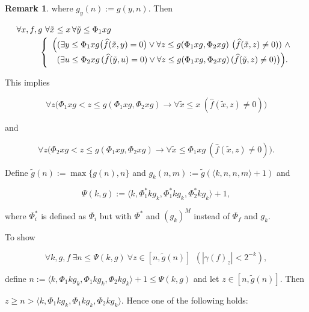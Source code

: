 \documentclass[1p]{elsarticle}
\newcommand{\ba}{\begin{array}} \newcommand{\ea}{\end{array}}
\newcommand{\be}[1][{e:\arabic{equation}}] { \begin{equation}\label{#1} }
\newcommand{\ee} { \end{equation} }
\theoremstyle{plain}
\theoremstyle{definition}
\newtheorem{rmk}[thm]{Remark}
\theoremstyle{remark}
\theoremstyle{definition}
\begin{document}
{\begin{rmk}
where $g_y(n):=g(y,n)$. Then

\[ \ba{l}

\forall x,f,g\ \forall\tilde x\leq x\,\forall \tilde{y}\le \Phi_1xg \\[1mm] 

\hspace*{1cm} \left\{ \ba{l} \Big( 

(\exists y\leq \Phi_1 xg \big(\widehat{f}(\tilde x, y)=0\big) \vee 

\forall z\leq g(\Phi_1 xg,\Phi_2xg)\ \big(\widehat{f}(\tilde x,z)\neq0)) \ 

\wedge \\ \hspace*{2mm}

 (\exists u\le\Phi_2xg\,(\widehat{f}(\tilde{y},u)=0)\vee \forall z\le 

g(\Phi_1xg,\Phi_2xg)\,(\widehat{f}(\tilde{y},z)\not= 0)\big) \Big).

\ea \right. \ea \]

This implies

\be[e:rmGU2]

\forall z \big(\Phi_1 xg< z\leq g(\Phi_1 xg,\Phi_2 xg)\rightarrow \forall \tilde x \leq x\ (\widehat{f}(\tilde x,z)\neq0)\big)

\ee

and

\be[e:rmGU3]

\forall z \big(\Phi_2 xg< z\leq g(\Phi_1 xg,\Phi_2 xg)\rightarrow \forall \tilde x \leq \Phi_1 xg\ (\widehat{f}(\tilde x,z)\neq0)\big).

\ee

Define $\tilde g(n):=\max\{g(n),n\}$ and $g_k(n,m):=\tilde g(\langle k,n,n,m\rangle+1)$ and 

\[

\Psi(k,g):=\langle k,\Phi^*_1 kg_k,\Phi^*_1 kg_k,\Phi^*_2 kg_k\rangle+1,

\]

where $\Phi^*_i$ is defined as $\Phi_i$ but with $\Phi^*$ and $(g_k)^{M}$ instead of $\Phi_f$ and $g_k$.

To show

\[

\forall k,g,f\ \exists n\leq \Psi(k,g)\ \forall z\in[n,\tilde g(n)]\ \ (|\gamma(f)_z| < 2^{-k}), \] 

define $n:=\langle k,\Phi_1 kg_k,\Phi_1 kg_k,\Phi_2 kg_k\rangle+1\leq \Psi(k,g)$ and let $z\in[n,\tilde g(n)]$. Then 

$z\geq n>\langle k,\Phi_1 kg_k,\Phi_1 kg_k,\Phi_2 kg_k\rangle$. Hence one of the following holds:


\end{rmk}}
\end{document}
